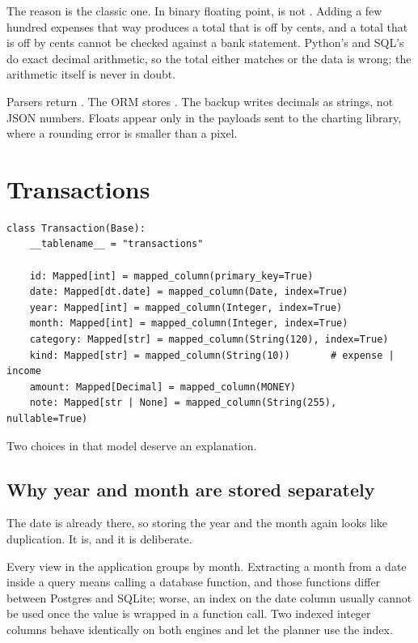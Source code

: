 The reason is the classic one. In binary floating point,  is not
. Adding a few hundred expenses that way produces a total that is off
by cents, and a total that is off by cents cannot be checked against a bank
statement. Python's  and SQL's  do exact decimal
arithmetic, so the total either matches or the data is wrong; the arithmetic
itself is never in doubt.

\begin{keypoint}
Parsers return . The ORM stores . The backup writes
decimals as strings, not JSON numbers. Floats appear only in the payloads sent
to the charting library, where a rounding error is smaller than a pixel.
\end{keypoint}

\section{Transactions}

\begin{lstlisting}[style=py]
class Transaction(Base):
    __tablename__ = "transactions"

    id: Mapped[int] = mapped_column(primary_key=True)
    date: Mapped[dt.date] = mapped_column(Date, index=True)
    year: Mapped[int] = mapped_column(Integer, index=True)
    month: Mapped[int] = mapped_column(Integer, index=True)
    category: Mapped[str] = mapped_column(String(120), index=True)
    kind: Mapped[str] = mapped_column(String(10))       # expense | income
    amount: Mapped[Decimal] = mapped_column(MONEY)
    note: Mapped[str | None] = mapped_column(String(255), nullable=True)
\end{lstlisting}

Two choices in that model deserve an explanation.

\subsection{Why year and month are stored separately}

The date is already there, so storing the year and the month again looks like
duplication. It is, and it is deliberate.

Every view in the application groups by month. Extracting a month from a date
inside a query means calling a database function, and those functions differ
between Postgres and SQLite; worse, an index on the date column usually cannot
be used once the value is wrapped in a function call. Two indexed integer columns
behave identically on both engines and let the planner use the index.

